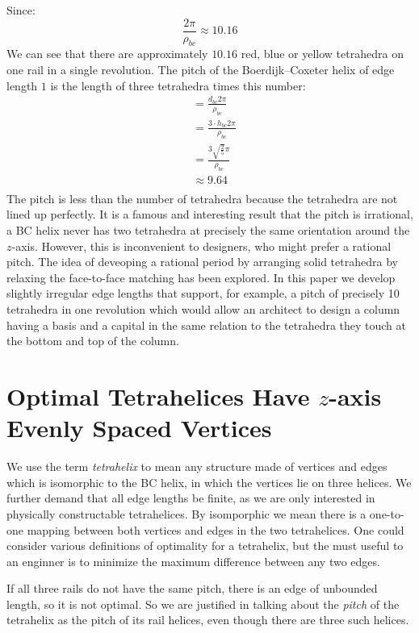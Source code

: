 \documentclass[11pt]{article}
\begin{document}
Since:
\[ \frac{2 \pi}{\rho_{bc}} \approx 10.16
\]
We can see that there are approximately $10.16$ red, blue or yellow tetrahedra on one rail in a single revolution.
The pitch of the Boerdijk--Coxeter helix of edge length $1$ is the length of three tetrahedra times this number:
\begin{align*}
  &= \frac{d_{bc} 2 \pi }{\rho_{bc}} \\  
  &= \frac{3 \cdot h_{bc} 2 \pi }{\rho_{bc}} \\
  &= \frac{3  \sqrt{\frac{2}{5}}  \pi}{\rho_{bc}} \\
  &\approx 9.64 \\
\end{align*}
The pitch is less than the number of tetrahedra because the tetrahedra
are not lined up perfectly.  It is a famous and interesting result
that the pitch is irrational, a BC helix never has two tetrahedra at
precisely the same orientation around the $z$-axis. However, this is
inconvenient to designers, who might prefer a rational pitch.
The idea of deveoping a rational period by arranging solid tetrahedra by relaxing the face-to-face matching
has been explored\cite{sadler2013periodic}. In this paper
we develop slightly irregular edge lengths that support, for example, a pitch of precisely 10
tetrahedra in one revolution which would allow an architect to design a
column having a basis and a capital in the same relation to the
tetrahedra they touch at the bottom and top of the column.


\section{Optimal Tetrahelices Have $z$-axis Evenly Spaced Vertices}

We use the term \emph{tetrahelix} to mean any structure made of
vertices and edges which is isomorphic to the BC helix, in which the
vertices lie on three helices. We further demand that all edge lengths
be finite, as we are only interested in physically constructable tetrahelices.
By isomporphic we mean there is a one-to-one mapping between both
vertices and edges in the two tetrahelices.
One could consider various definitions of optimality for a
tetrahelix, but the must useful to an enginner is to minimize the
maximum difference between any two edges.

If all three rails do not have the same pitch, there is an edge of
unbounded length, so it is not optimal. So we are justified in talking about the
\emph{pitch} of 
the tetrahelix as the pitch of its rail helices, even though there are
three such helices.
\end{document}

